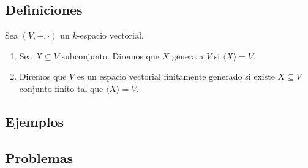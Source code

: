 \subsection*{Definiciones}
Sea \( (V, +, \cdot) \) un \( k \)-espacio vectorial.
\begin{enumerate}
    \item Sea \( X \subseteq V \) subconjunto. Diremos que \( X \) genera a \( V \) si \( \langle X \rangle = V \).
    \item Diremos que \( V \) es un espacio vectorial finitamente generado si existe \( X \subseteq V \) conjunto finito tal que \( \langle X \rangle = V \).
\end{enumerate}

\subsection*{Ejemplos}

\subsection*{Problemas}